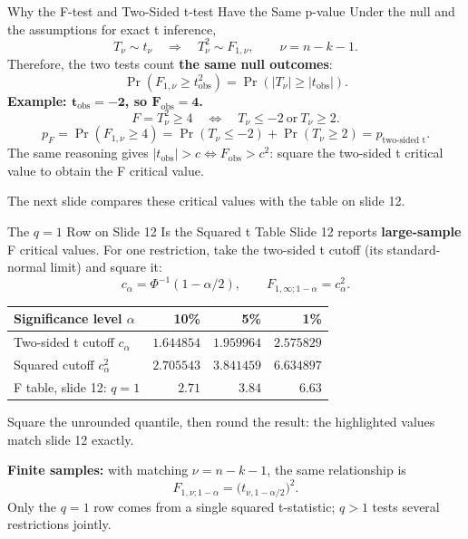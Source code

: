 \documentclass[notes,10pt, aspectratio=169]{beamer}
\begin{document}
\begin{frame}{\large Why the F-test and Two-Sided t-test Have the Same p-value}
\small
Under the null and the assumptions for exact t inference,
\[
T_\nu\sim t_\nu\quad\Longrightarrow\quad T_\nu^2\sim F_{1,\nu},
\qquad \nu=n-k-1.
\]
Therefore, the two tests count \textbf{the same null outcomes}:
\[
\boxed{\Pr(F_{1,\nu}\geq t_{\mathrm{obs}}^2)
=\Pr(|T_\nu|\geq |t_{\mathrm{obs}}|).}
\]
\textbf{Example: $\boldsymbol{t_{\mathrm{obs}}=-2}$, so $\boldsymbol{F_{\mathrm{obs}}=4}$.}
\[
F=T_\nu^2\geq4\quad\Longleftrightarrow\quad T_\nu\leq-2\ \text{or}\ T_\nu\geq2.
\]
\[
p_F=\Pr(F_{1,\nu}\geq4)
=\Pr(T_\nu\leq-2)+\Pr(T_\nu\geq2)
=p_{\text{two-sided t}}.
\]
The same reasoning gives $|t_{\mathrm{obs}}|>c\iff F_{\mathrm{obs}}>c^2$: square the two-sided t critical value to obtain the F critical value.
\par\smallskip
The next slide compares these critical values with the table on slide 12.
\end{frame}

\begin{frame}{The $q=1$ Row on Slide 12 Is the Squared t Table}
\small
Slide 12 reports \textbf{large-sample} F critical values. For one restriction, take the two-sided t cutoff (its standard-normal limit) and square it:
\[
 c_\alpha=\Phi^{-1}(1-\alpha/2),\qquad
 F_{1,\infty;1-\alpha}=c_\alpha^2.
\]
\begin{center}
\renewcommand{\arraystretch}{1.35}
\begin{tabular}{lrrr}
\hline
\textbf{Significance level $\alpha$} & \textbf{10\%} & \textbf{5\%} & \textbf{1\%}\\\hline
Two-sided t cutoff $c_\alpha$ & $1.644854$ & $1.959964$ & $2.575829$\\
Squared cutoff $c_\alpha^2$ & $2.705543$ & $3.841459$ & $6.634897$\\
\rowcolor[HTML]{DAE8FC}
F table, slide 12: $q=1$ & $\mathbf{2.71}$ & $\mathbf{3.84}$ & $\mathbf{6.63}$\\\hline
\end{tabular}
\end{center}
Square the unrounded quantile, then round the result: the highlighted values match slide 12 exactly.
\par\medskip
\textbf{Finite samples:} with matching $\nu=n-k-1$, the same relationship is
\[
 F_{1,\nu;1-\alpha}=\bigl(t_{\nu,1-\alpha/2}\bigr)^2.
\]
Only the $q=1$ row comes from a single squared t-statistic; $q>1$ tests several restrictions jointly.
\end{frame}
\end{document}

